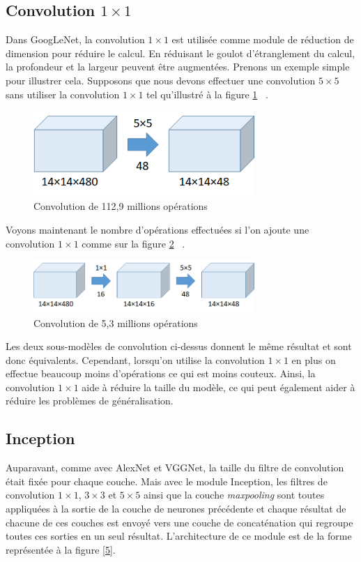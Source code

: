 \documentclass{article}
\begin{document}
\subsection{Convolution $1\times 1$}
Dans GoogLeNet, la convolution $1\times 1$ est utilisée comme module de
réduction de dimension pour réduire le calcul. En réduisant le goulot
d'étranglement du calcul, la profondeur et la largeur peuvent être augmentées.
Prenons un exemple simple pour illustrer cela. Supposons que nous devons
effectuer une convolution $5\times 5$ sans utiliser la convolution $1\times 1$
tel qu'illustré à la figure \ref{3} ~\cite{tsang_2018}.

\begin{figure}[htbp]
    \includegraphics[width=8.4cm]{./figures/Figure2.png} 
    \caption{Convolution de 112,9 millions opérations}
    \label{3} 
\end{figure} 

Voyons maintenant le nombre d’opérations effectuées si l’on ajoute une
convolution $1\times 1$ comme sur la figure \ref{4} ~\cite{tsang_2018}.

\begin{figure}[htbp]
    \includegraphics[width=8.4cm]{./figures/Figure3.png} 
    \caption{Convolution de 5,3 millions opérations}
    \label{4} 
\end{figure} 

Les deux sous-modèles de convolution ci-dessus donnent le même résultat et sont
donc équivalents. Cependant, lorsqu’on utilise la convolution $1\times 1$ en
plus on effectue beaucoup moins d’opérations ce qui est moins couteux. Ainsi,
la convolution $1\times 1$ aide à réduire la taille du modèle, ce qui peut
également aider à réduire les problèmes de généralisation.

\subsection{Inception}
Auparavant, comme avec AlexNet et VGGNet, la taille du filtre de convolution
était fixée pour chaque couche. Mais avec le module Inception, les filtres de
convolution $1\times 1$,  $3\times 3$ et  $5\times 5$ ainsi que la couche
\textit{maxpooling} sont toutes appliquées à la sortie de la couche de neurones
précédente et chaque résultat de chacune de ces couches est envoyé vers une
couche de concaténation qui regroupe toutes ces sorties en un seul résultat.
L’architecture de ce module est de la forme représentée à la figure \ref{5}.
 ~\cite{43022}
\end{document}

